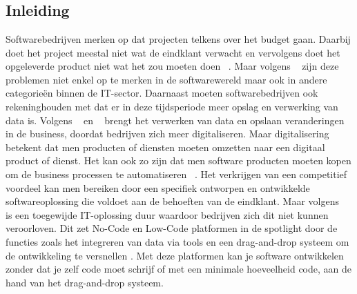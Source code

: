 \chapter{}%
\label{ch:stand-van-zaken}

\section{Inleiding}%
\label{sec:inleiding}
Softwarebedrijven merken op dat projecten telkens over het budget gaan. Daarbij doet het project meestal niet wat de eindklant verwacht en vervolgens doet het opgeleverde product niet wat het zou moeten doen ~\autocite{Moskal_2021}.
Maar volgens ~\textcite{Moskal_2021} zijn deze problemen niet enkel op te merken in de softwarewereld maar ook in andere categorieën binnen de IT-sector. 
Daarnaast moeten softwarebedrijven ook rekeninghouden met dat er in deze tijdsperiode meer opslag en verwerking van data is.
Volgens ~\textcite{Moskal_2021} en ~\textcite{Parviainen_2022} brengt het verwerken van data en opslaan veranderingen in de business, 
doordat bedrijven zich meer digitaliseren. Maar digitalisering betekent dat men producten of diensten moeten omzetten naar een digitaal product 
of dienst. Het kan ook zo zijn dat men software producten moeten kopen om de business processen te automatiseren ~\autocite{Moskal_2021}. 
Het verkrijgen van een competitief voordeel kan men bereiken door een specifiek ontworpen en ontwikkelde softwareoplossing die voldoet aan de behoeften van de eindklant.
Maar volgens ~\textcite{Moskal_2021} is een toegewijde IT-oplossing duur waardoor bedrijven zich dit niet kunnen veroorloven. Dit zet No-Code en Low-Code platformen in de spotlight
door de functies zoals het integreren van data via tools en een drag-and-drop systeem om de ontwikkeling te versnellen \autocite{Kulkarni_2021}. Met deze platformen kan je software ontwikkelen zonder dat je
zelf code moet schrijf of met een minimale hoeveelheid code, aan de hand van het drag-and-drop systeem.
